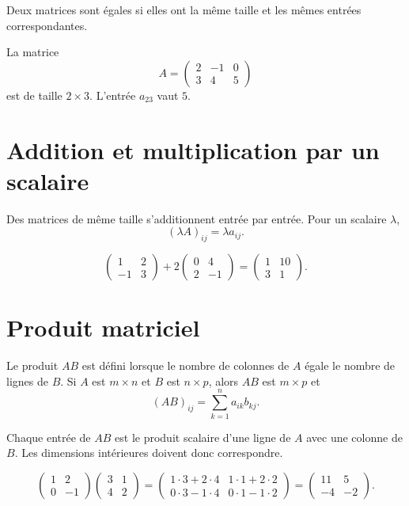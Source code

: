 \documentclass[12pt,a4paper,openany]{book}
\begin{document}
Deux matrices sont égales si elles ont la même taille et les mêmes entrées correspondantes.

\begin{examplebox}
La matrice
\[
A=\begin{pmatrix}2&-1&0\\3&4&5\end{pmatrix}
\]
est de taille $2\times3$. L'entrée $a_{23}$ vaut $5$.
\end{examplebox}

\section{Addition et multiplication par un scalaire}

Des matrices de même taille s'additionnent entrée par entrée. Pour un scalaire $\lambda$,
\[
(\lambda A)_{ij}=\lambda a_{ij}.
\]

\begin{examplebox}
\[
\begin{pmatrix}1&2\\-1&3\end{pmatrix}
+2\begin{pmatrix}0&4\\2&-1\end{pmatrix}
=
\begin{pmatrix}1&10\\3&1\end{pmatrix}.
\]
\end{examplebox}

\section{Produit matriciel}

Le produit $AB$ est défini lorsque le nombre de colonnes de $A$ égale le nombre de lignes de $B$. Si $A$ est $m\times n$ et $B$ est $n\times p$, alors $AB$ est $m\times p$ et
\[
(AB)_{ij}=\sum_{k=1}^n a_{ik}b_{kj}.
\]

\begin{intuitionbox}
Chaque entrée de $AB$ est le produit scalaire d'une ligne de $A$ avec une colonne de $B$. Les dimensions intérieures doivent donc correspondre.
\end{intuitionbox}

\begin{examplebox}
\[
\begin{pmatrix}1&2\\0&-1\end{pmatrix}
\begin{pmatrix}3&1\\4&2\end{pmatrix}
=
\begin{pmatrix}
1\cdot3+2\cdot4&1\cdot1+2\cdot2\\
0\cdot3-1\cdot4&0\cdot1-1\cdot2
\end{pmatrix}
=
\begin{pmatrix}11&5\\-4&-2\end{pmatrix}.
\]
\end{examplebox}
\end{document}
